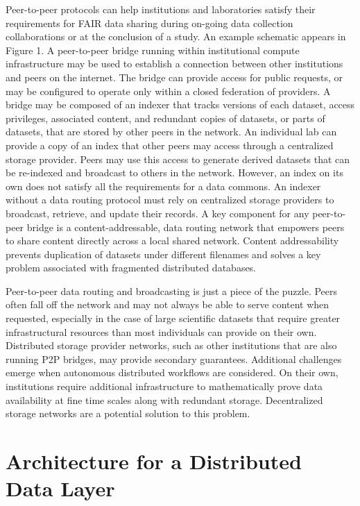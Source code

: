 \documentclass[conference]{IEEEtran}
\begin{document}
Peer-to-peer protocols can help institutions and laboratories satisfy their requirements for FAIR data sharing during on-going data collection collaborations or at the conclusion of a study. An example schematic appears in Figure 1. A peer-to-peer bridge running within institutional compute infrastructure may be used to establish a connection between other institutions and peers on the internet. The bridge can provide access for public requests, or may be configured to operate only within a closed federation of providers.  A bridge may be composed of an indexer that tracks versions of each dataset, access privileges, associated content, and redundant copies of datasets, or parts of datasets, that are stored by other peers in the network. An individual lab can provide a copy of an index that other peers may access through a centralized storage provider. Peers may use this access to generate derived datasets that can be re-indexed and broadcast to others in the network. However, an index on its own does not satisfy all the requirements for a data commons. An indexer without a data routing protocol must rely on centralized storage providers to broadcast, retrieve, and update their records. A key component for any peer-to-peer bridge is a content-addressable, data routing network that empowers peers to share content directly across a local shared network. Content addressability prevents duplication of datasets under different filenames and solves a key problem associated with fragmented distributed databases.

Peer-to-peer data routing and broadcasting is just a piece of the puzzle. Peers often fall off the network and may not always be able to serve content when requested, especially in the case of large scientific datasets that require greater infrastructural resources than most individuals can provide on their own. Distributed storage provider networks, such as other institutions that are also running P2P bridges, may provide secondary guarantees. Additional challenges emerge when autonomous distributed workflows are considered. On their own, institutions require additional infrastructure to mathematically prove data availability at fine time scales along with redundant storage. Decentralized storage networks are a potential solution to this problem.

\section{Architecture for a Distributed Data Layer}
\end{document}
